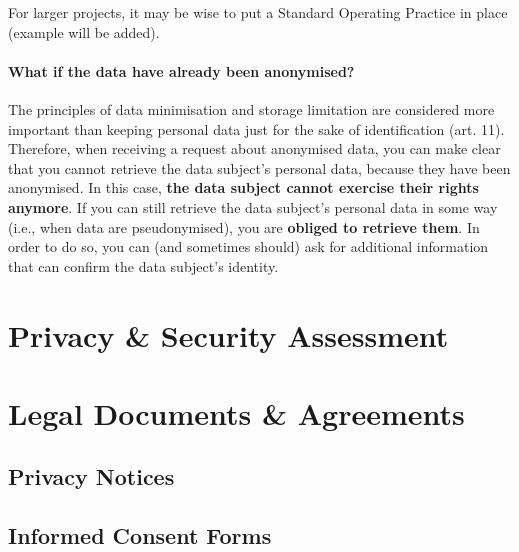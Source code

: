 \documentclass[
]{book}
\begin{document}
For larger projects, it may be wise to put a Standard Operating Practice in place (example will be added).

\hypertarget{what-if-the-data-have-already-been-anonymised}{%
\subsubsection{What if the data have already been anonymised?}\label{what-if-the-data-have-already-been-anonymised}}

The principles of data minimisation and storage limitation are considered more important than keeping personal
data just for the sake of identification (art. 11).
Therefore, when receiving a request about anonymised data, you can make clear that you cannot retrieve the data subject's
personal data, because they have been anonymised. In this case, \textbf{the data subject cannot exercise their rights anymore}.
If you can still retrieve the data subject's personal data in some way (i.e., when data are pseudonymised), you are
\textbf{obliged to retrieve them}. In order to do so, you can (and sometimes should) ask for additional information that can
confirm the data subject's identity.

\hypertarget{privacy-by-design}{%
\chapter{Privacy \& Security Assessment}\label{privacy-by-design}}

\hypertarget{legal-documents}{%
\chapter*{Legal Documents \& Agreements}\label{legal-documents}}

\hypertarget{privacy-notices}{%
\section*{Privacy Notices}\label{privacy-notices}}

\hypertarget{informed-consent-forms}{%
\section*{Informed Consent Forms}\label{informed-consent-forms}}
\end{document}
